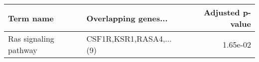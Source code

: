 \begin{tabular}{llr}
\toprule
            Term name &    Overlapping genes... &  Adjusted p-value \\
\midrule
Ras signaling pathway & CSF1R,KSR1,RASA4,...(9) &          1.65e-02 \\
\bottomrule
\end{tabular}
